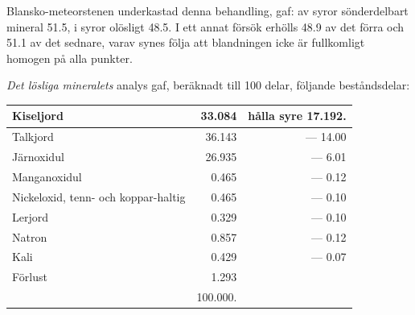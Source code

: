 \documentclass[a4paper, 12pt, oneside, swedish]{article}
\begin{document}
Blansko-meteorstenen underkastad denna behandling, gaf: av syror sönderdelbart mineral 51.5, i syror olösligt 48.5. I ett annat försök erhölls 48.9 av det förra och 51.1 av det sednare, varav synes följa att blandningen icke är fullkomligt homogen på alla punkter.

\emph{Det lösliga mineralets} analys gaf, beräknadt till 100 delar, följande beståndsdelar:
\begin{table}[H]
    \centering\small
    \begin{tabular}{|l|r|r|}
    \hline
        Kiseljord & 33.084 & hålla syre 17.192. \\ \hline
        Talkjord & 36.143 & --- 14.00 \\ \hline
        Järnoxidul & 26.935 & --- 6.01 \\ \hline
        Manganoxidul & 0.465 & --- 0.12 \\ \hline
        Nickeloxid, tenn- och koppar-haltig & 0.465 & --- 0.10 \\ \hline
        Lerjord & 0.329 & --- 0.10 \\ \hline
        Natron & 0.857 & --- 0.12 \\ \hline
        Kali & 0.429 & --- 0.07 \\ \hline
        Förlust & 1.293 & ~ \\ \hline
        ~ & 100.000. & ~ \\ \hline
    \end{tabular}
\end{table}
\end{document}
